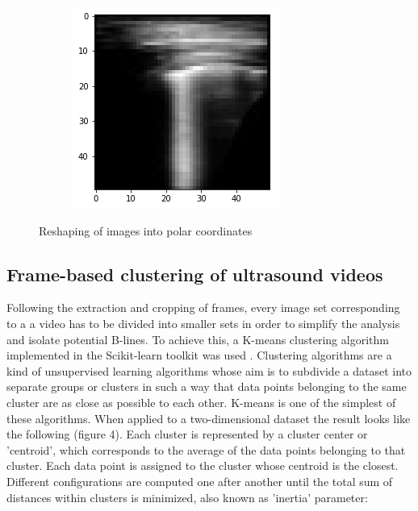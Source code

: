 \documentclass[11pt]{article} %
\begin{document}
\begin{figure}
\begin{subfigure}{0.35\textwidth}
		\caption{}
		\end{subfigure}
		\begin{subfigure}{0.30\textwidth}
		\includegraphics[width=\textwidth]{figuras/polar.png}
		\caption{}
		\end{subfigure}
	\caption{Reshaping of images into polar coordinates}
	\end{figure}	
	
	
\subsection{Frame-based clustering of ultrasound videos}

	Following the extraction and cropping of frames, every image set corresponding to a a video has to be divided into smaller sets in order to simplify the analysis and isolate potential B-lines. To achieve this, a K-means clustering algorithm implemented in the Scikit-learn toolkit was used \cite{sklearn}. Clustering algorithms are a kind of unsupervised learning algorithms whose aim is to subdivide a dataset into separate groups or clusters in such a way that data points belonging to the same cluster are as close as possible to each other. K-means is one of the simplest of these algorithms. When applied to a two-dimensional dataset the result looks like the following (figure 4)\cite{python}. Each cluster is represented by a cluster center or 'centroid', which corresponds to the average of the data points belonging to that cluster. Each data point is assigned to the cluster whose centroid is the closest. Different configurations are computed one after another until the total sum of distances within clusters is minimized, also known as 'inertia' parameter:
	
\end{document}
